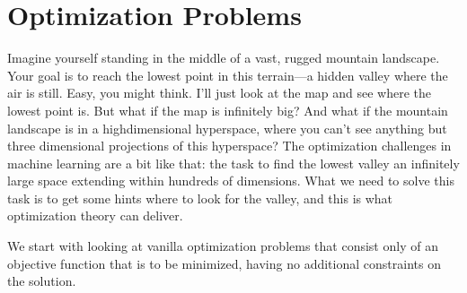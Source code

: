 \documentclass[letterpaper,10pt,english]{jupyterBook}
\let\sphinxpxdimen\pdfpxdimen\else\newdimen\sphinxpxdimen
\begin{document}
\sphinxstepscope


\section{Optimization Problems}
\label{\detokenize{optimization_problems:optimization-problems}}\label{\detokenize{optimization_problems::doc}}

\begin{figure}
\centering
\noindent\sphinxincludegraphics[height=200\sphinxpxdimen]{{mountain}.jpg}
\end{figure}

\sphinxAtStartPar
Imagine yourself standing in the middle of a vast, rugged mountain landscape. Your goal is to reach the lowest point in this terrain—a hidden valley where the air is still. Easy, you might think. I’ll just look at the map and see where the lowest point is. But what if the map is infinitely big? And what if the mountain landscape is in a high\sphinxhyphen{}dimensional hyperspace, where you can’t see anything but three dimensional projections of this hyperspace? The optimization challenges in machine learning are a bit like that: the task to find the lowest valley an infinitely large space extending within hundreds of dimensions. What we need to solve this task is to get some hints where to look for the valley, and this is what optimization theory can deliver.

\sphinxAtStartPar
We start with looking at vanilla optimization problems that consist only of an objective function that is to be minimized, having no additional constraints on the solution.
\end{document}
